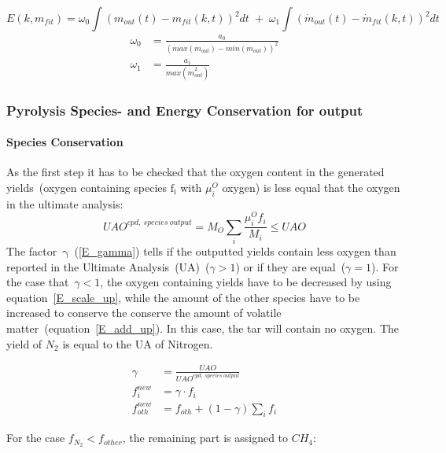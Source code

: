 \begin{equation}\label{E_LS}
 E(k,m_{fit})=\omega_0 \int \left( m_{out}(t) - m_{fit}(k,t) \right)^2 dt \; + \; \omega_1 \int \left( \dot m_{out}(t) - \dot m_{fit}(k,t) \right)^2 dt
\end{equation}
\begin{align}
 \label{E_Weight_Param1}
\omega_0 &= \frac{a_0}{\left( max(m_{out})-min(m_{out}) \right)^2}\\
 \label{E_Weight_Param2}
\omega_1 &= \frac{a_1}{max(\dot{m}_{out}^2)}
\end{align}

\subsubsection{Pyrolysis Species- and Energy Conservation for \CPD output}\label{SSS_ConsEqCPD}

\paragraph{Species Conservation}
As the first step it has to be checked that the oxygen content in the generated yields~(oxygen containing species $\mathrm{f_i}$ with $\mu_i^{O}$ oxygen) is less equal that the oxygen in the ultimate analysis:
\begin{equation}
 UAO^{cpd, \: species \: output} = M_{O} \sum_i \frac{\mu_i^{O} f_i}{M_i} \le UAO 
 \label{E_O_balance}
\end{equation}
The factor~$\mathrm{\gamma}$~(\ref{E_gamma}) tells if the outputted yields contain less oxygen than reported in the Ultimate Analysis~(UA)~($\gamma > 1$) or if they are equal~($\gamma = 1$). For the case that~$\gamma < 1$, the oxygen containing yields have to be decreased by using equation~\ref{E_scale_up}, while the amount of the other species have to be increased to conserve the conserve the amount of volatile matter~(equation~\ref{E_add_up}). In this case, the tar will contain no oxygen. The yield of $N_2$ is equal to the UA of Nitrogen.

\begin{align}
 \gamma &= \frac{UAO}{UAO^{cpd, \: species \: output}}
 \label{E_gamma}\\
 f_i^{new} &= \gamma \cdot f_i 
 \label{E_scale_up}\\
 f_{oth}^{new} &= f_{oth} + \left(1-\gamma\right) \sum_i f_i
 \label{E_add_up}
\end{align}

For the case $f_{N_2}<f_{other}$, the remaining part is assigned to $CH_4$:

